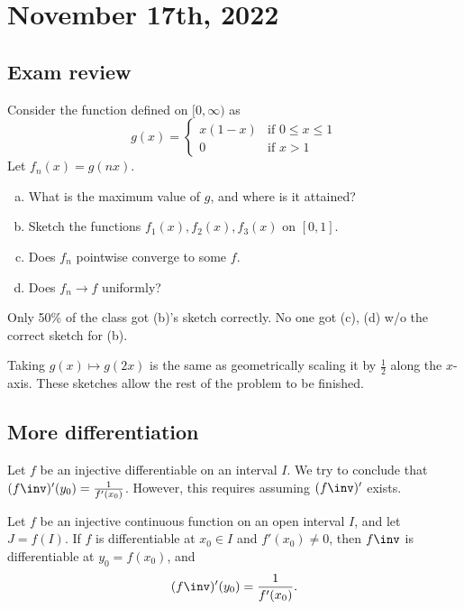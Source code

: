 \documentclass[11pt]{scrartcl}
\numberwithin{equation}{section}
\begin{document}
\section{November 17th, 2022}
\subsection{Exam review}
\begin{ques}
    Consider the function defined on $[0,\infty)$ as 
    \[
        g(x) = \begin{cases}
            x(1-x) &\text{if }0\leq x\leq 1 \\
            0 &\text{if }x>1
        \end{cases}
    \]
    Let $f_n(x)=g(nx)$.
    \begin{enumerate}[a)]
        \item What is the maximum value of $g$, and where is it attained?
        \item Sketch the functions $f_1(x), f_2(x), f_3(x)$ on $[0,1]$.
        \item Does $f_n$ pointwise converge to some $f$.
        \item Does $f_n \to f$ uniformly?
    \end{enumerate}
\end{ques}
Only 50\% of the class got (b)'s sketch correctly.
No one got (c), (d) w/o the correct sketch for (b).
\begin{soln}
    Taking $g(x) \mapsto g(2x)$ is the same as geometrically scaling it by 
    $\frac{1}{2}$ along the $x$-axis. 
    These sketches allow the rest of the problem 
    to be finished.
\end{soln}
\subsection{More differentiation}
Let $f$ be an injective differentiable on an interval $I$.
We try to conclude that $(f\inv)'(y_0) = \frac{1}{f'(x_0)}$.
However, this requires assuming $(f\inv)'$ exists.

\begin{theorem}
    \label{thm:funcinvderivative}
    Let $f$ be an injective continuous function on an open interval $I$, 
    and let $J=f(I)$. If $f$ is differentiable at $x_0\in I$ and 
    $f'(x_0) \neq 0$, then $f\inv$ is differentiable at $y_0=f(x_0)$, and 
    \[
        (f\inv)'(y_0) = \frac{1}{f'(x_0)}.
    \]
\end{theorem}
\end{document}
